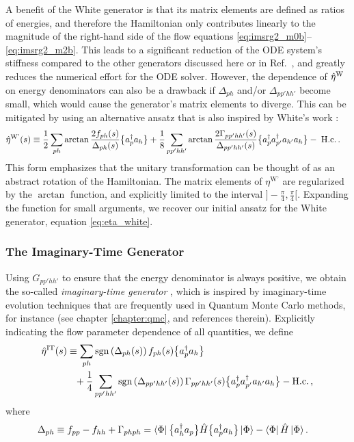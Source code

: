 A benefit of the White generator is that its matrix elements are defined 
as ratios of energies, and therefore the Hamiltonian only contributes linearly 
to the magnitude of the right-hand side of the flow equations \eqref{eq:imsrg2_m0b}--
\eqref{eq:imsrg2_m2b}. This leads to a significant reduction of the 
ODE system's stiffness compared to the other generators discussed here or in
Ref.~\cite{Hergert:2016jk}, and greatly reduces the numerical effort for the
ODE solver. However, the dependence of $\hat{\eta}^\text{W}$ on energy denominators
can also be a drawback if $\Delta_{ph}$ and/or $\Delta_{pp'hh'}$ become
small, which would cause the generator's matrix elements to diverge. This can be
mitigated by using an alternative ansatz that is also inspired by White's work 
\cite{White:2002fk}:
\begin{align}
  \etaO^\text{W'}(s)
  &\equiv\frac{1}{2}\sum_{ph}\arctan\frac{2 f_{ph}(s)}{\Delta_{ph}(s)}\nord{\aaO_{p}\aO_{h}}
  +\frac{1}{8}\sum_{pp'hh'}\arctan\frac{2\Gamma_{pp'hh'}(s)}{\Delta_{pp'hh'}(s)}
    \nord{\aaO_{p}\aaO_{p'}\aO_{h'}\aO_{h}}-\;\text{H.c.}\label{eq:eta_whiteatan}\,.
\end{align}
This form emphasizes that the unitary transformation can be thought of as an
abstract rotation of the Hamiltonian. The matrix elements of $\eta^\text{W'}$
are regularized by the $\arctan$ function, and explicitly limited to the 
interval $]-\tfrac{\pi}{4},\tfrac{\pi}{4}[$. Expanding the function for 
small arguments, we recover our initial ansatz for the White generator, 
equation \eqref{eq:eta_white}. 

%
%
\subsubsection{\label{sec:imsrg_generator_imtime}The Imaginary-Time Generator}
Using $G_{pp'hh'}$ to ensure that the energy denominator is always
positive, we obtain the so-called \emph{imaginary-time generator}
\cite{Morris:2015ve,Hergert:2014vn,Hergert:2016jk},
which is inspired by imaginary-time evolution techniques that are 
frequently used in Quantum Monte Carlo methods, for instance (see
chapter \ref{chapter:qmc}, \cite{Carlson:2015lq} and references therein). Explicitly 
indicating the flow parameter dependence of all quantities, we
define
\begin{align}
  \etaO^\text{IT}(s)&\equiv\sum_{ph} \sgn\!\left(\Delta_{ph}(s)\right) f_{ph}(s)\nord{\aaO_{p}\aO_{h}}\notag\\
  &\hphantom{=}
   +\frac{1}{4}\sum_{pp'hh'}\sgn\!\left(\Delta_{pp'hh'}(s)\right)\Gamma_{pp'hh'}(s)
    \nord{\aaO_{p}\aaO_{p'}\aO_{h'}\aO_{h}}-\text{H.c.}\,,\label{eq:eta_imtime}
\end{align}
where
\begin{align}
  \Delta_{ph}&\equiv
    f_{pp}-f_{hh} + \Gamma_{phph} 
    =\dmatrixe{\Phi}{\nord{\aaO_{h}\aO_{p}}\HO\nord{\aaO_{p}\aO_{h}}}-\dmatrixe{\Phi}{\HO}\,.\label{eq:def_epsteinnesbet_1b}
\end{align}

